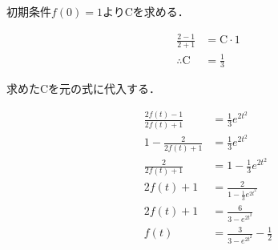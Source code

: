初期条件$f(0)=1$より$\mathrm{C}$を求める．

\begin{align*}
  \frac{2-1}{2+1} &= \mathrm{C}\cdot 1 \\
  \therefore \mathrm{C} &= \frac{1}{3}
\end{align*}

求めた$\mathrm{C}$を元の式に代入する．

\begin{align*}
  \frac{2f(t)-1}{2f(t)+1} &= \frac{1}{3} e^{2t^2} \\
  1 - \frac{2}{2f(t)+1} &= \frac{1}{3} e^{2t^2} \\
  \frac{2}{2f(t)+1} &= 1 - \frac{1}{3} e^{2t^2} \\
  2f(t)+1 &= \frac{2}{1 - \frac{1}{3} e^{2t^2}} \\
  2f(t)+1 &= \frac{6}{3 - e^{2t^2}} \\
  f(t) &= \frac{3}{3 - e^{2t^2}} - \frac{1}{2} \\
\end{align*}